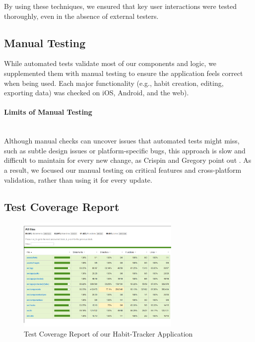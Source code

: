 By using these techniques, we ensured that key user interactions were tested thoroughly, even in the absence of external testers.


\subsection{Manual Testing}

While automated tests validate most of our components and logic, we supplemented them with manual testing to ensure the application feels correct when being used. Each major functionality (e.g., habit creation, editing, exporting data) was checked on iOS, Android, and the web).

\paragraph{Limits of Manual Testing}\mbox{}\\
Although manual checks can uncover issues that automated tests might miss, such as subtle design issues or platform-specific bugs, this approach is slow and difficult to maintain for every new change, as Crispin and Gregory point out \cite{crispin2009agiletesting}. As a result, we focused our manual testing on critical features and cross-platform validation, rather than using it for every update.

\subsection{Test Coverage Report} \label{sect:test-coverage} 
\begin{figure}[H]
    \centering
    \includegraphics[width=0.7\textwidth]{resources/test_coverage.pdf}
    \caption{Test Coverage Report of our Habit-Tracker Application}
    \label{fig:test_coverage}
\end{figure}

